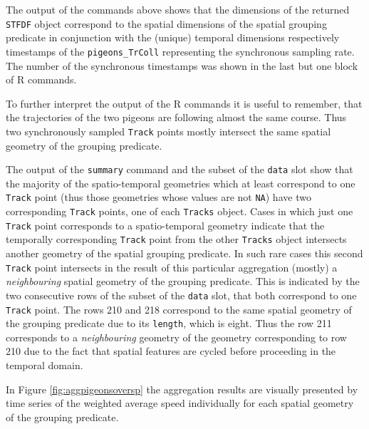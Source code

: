 \documentclass[12pt, oneside, a4paper]{scrbook}
\let\proglang=\textsf
\let\code=\texttt
\begin{document}
The output of the commands above shows that the dimensions of the returned \code{STFDF} object correspond to the spatial dimensions of the spatial grouping predicate in conjunction with the (unique) temporal dimensions respectively timestamps of the \code{pigeons\_TrColl} representing the synchronous sampling rate. The number of the synchronous timestamps was shown in the last but one block of \proglang{R} commands.
\par\medskip

To further interpret the output of the \proglang{R} commands it is useful to remember, that the trajectories of the two pigeons are following almost the same course. Thus two synchronously sampled \code{Track} points mostly intersect the same spatial geometry of the grouping predicate.
\par\medskip

The output of the \code{summary} command and the subset of the \code{data} slot show that the majority of the spatio-temporal geometries which at least correspond to one \code{Track} point (thus those geometries whose values are not \code{NA}) have two corresponding \code{Track} points, one of each \code{Tracks} object.
Cases in which just one \code{Track} point corresponds to a spatio-temporal geometry indicate that the temporally corresponding \code{Track} point from the other \code{Tracks} object intersects another geometry of the spatial grouping predicate. 
In such rare cases this second \code{Track} point intersects in the result of this particular aggregation (mostly) a \textit{neighbouring} spatial geometry of the grouping predicate. 
This is indicated by the two consecutive rows of the subset of the \code{data} slot, that both correspond to one \code{Track} point. The rows 210 and 218 correspond to the same spatial geometry of the grouping predicate due to its \code{length}, which is eight. 
Thus the row 211 corresponds to a \textit{neighbouring} geometry of the geometry corresponding to row 210 due to the fact that spatial features are cycled before proceeding in the temporal domain.
\par\medskip

In Figure \ref{fig:aggpigeonsoversp} the aggregation results are visually presented by time series of the weighted average speed individually for each spatial geometry of the grouping predicate. 
\par\medskip
\end{document}
